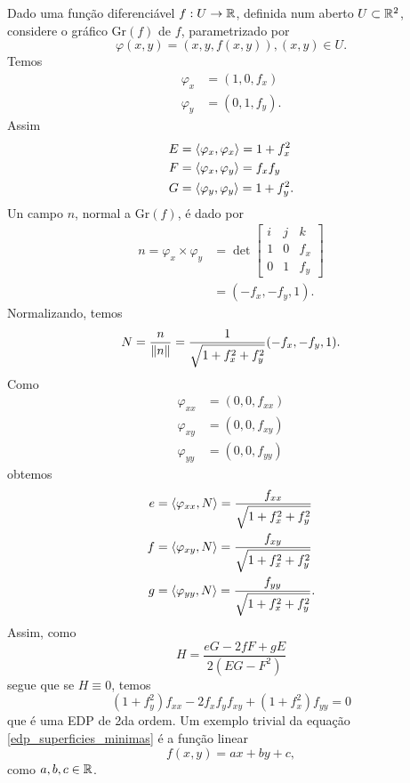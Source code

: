 \begin{exemplo}
	Dado uma função diferenciável $f: U \rightarrow \mathbb{R}$, definida num aberto $U \subset \mathbb{R}^2$, considere o gráfico $\text{Gr}(f)$ de $f$, parametrizado por
	\begin{equation*}
	\varphi(x,y) = (x,y,f(x,y)), (x,y) \in U.
	\end{equation*}
	Temos
	\begin{align*}
	\varphi_x &= (1,0,f_x)\\
	\varphi_y &= (0,1,f_y).
	\end{align*}
	Assim
	\begin{align*}
	E &= \left\langle \varphi_x,\varphi_x \right\rangle = 1 + f_x^2\\
	F &= \left\langle \varphi_x,\varphi_y \right\rangle = f_x f_y\\
	G &= \left\langle \varphi_y,\varphi_y \right\rangle = 1 + f_y^2.
	\end{align*}
	Un campo $n$, normal a $\text{Gr}(f)$, é dado por
	\begin{align*}
	n = \varphi_x \times \varphi_y &= \det \left[ \begin{matrix}
	i & j & k\\
	1 & 0 & f_x\\
	0 & 1 & f_y
	\end{matrix} \right]\\
	&= (-f_x, -f_y, 1).
	\end{align*}
	Normalizando, temos
	\begin{equation*}
	N = \frac{n}{\left\| n \right\|} = \frac{1}{\sqrt{1 + f_x^2 + f_y^2}}(-f_x, -f_y, 1).
	\end{equation*}
	Como
	\begin{align*}
	\varphi_{xx} &= (0, 0, f_{xx})\\
	\varphi_{xy} &= (0, 0, f_{xy})\\
	\varphi_{yy} &= (0, 0, f_{yy})
	\end{align*}
	obtemos
	\begin{align*}
	e &= \left\langle \varphi_{xx},N \right\rangle = \frac{f_{xx}}{\sqrt{1 + f_x^2 + f_y^2}}\\
	f &= \left\langle \varphi_{xy},N \right\rangle = \frac{f_{xy}}{\sqrt{1 + f_x^2 + f_y^2}}\\
	g &= \left\langle \varphi_{yy},N \right\rangle = \frac{f_{yy}}{\sqrt{1 + f_x^2 + f_y^2}}.
	\end{align*}
	Assim, como
	\begin{equation*}
	H = \frac{eG - 2fF + gE}{2(EG - F^2)}
	\end{equation*}
	segue que se $H \equiv 0$, temos
	\begin{equation}\label{edp_superficies_minimas}
	(1 + f_y^2) f_{xx}  - 2 f_x f_y f_{xy} + (1+f_x^2) f_{yy} = 0
	\end{equation}
	que é uma EDP de 2da ordem.
	Um exemplo trivial da equação \ref{edp_superficies_minimas} é a função linear
	\begin{equation*}
	f(x,y) = ax + by + c,
	\end{equation*}
	como $a, b, c \in \mathbb{R}$.
\end{exemplo}

